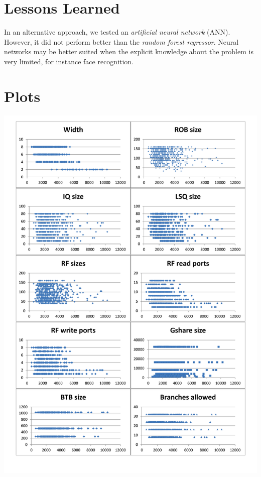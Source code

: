 \documentclass[a4paper, 11pt]{article}
\begin{document}
\section{Lessons Learned} In an alternative approach, we tested an \textit{artificial neural network} (ANN). However, it did not perform better than the \textit{random forest regressor}. Neural networks may be better suited when the explicit knowledge about the problem is very limited, for instance face recognition.

\section{Plots}\label{plots}
\includegraphics[height=0.8\textheight]{graph.png}
\end{document}
